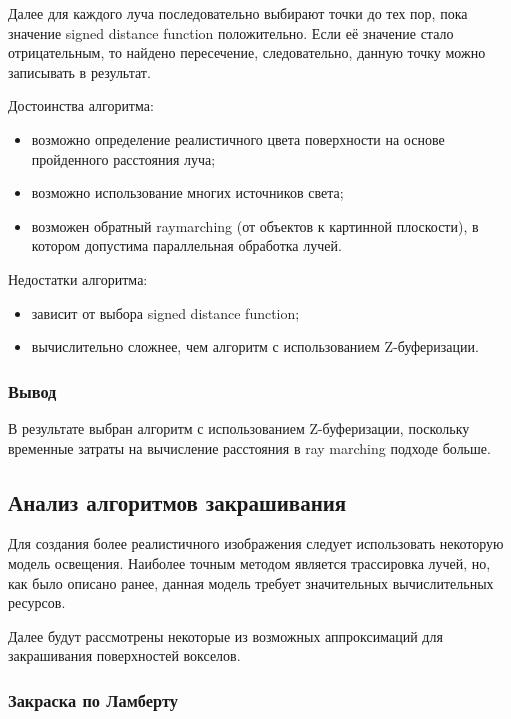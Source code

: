 Далее для каждого луча последовательно выбирают точки до тех пор, пока значение signed distance function положительно. Если её значение стало отрицательным, то найдено пересечение, следовательно, данную точку можно записывать в результат.

Достоинства алгоритма:
\begin{itemize}
    \item возможно определение реалистичного цвета поверхности на основе пройденного расстояния луча;
    \item возможно использование многих источников света;
    \item возможен обратный raymarching (от объектов к картинной плоскости), в котором допустима параллельная обработка лучей.
\end{itemize}

Недостатки алгоритма:
\begin{itemize}
    \item зависит от выбора signed distance function;
    \item вычислительно сложнее, чем алгоритм с использованием Z-буферизации\cite{site:raymarching}.
\end{itemize}

\subsubsection{Вывод}

В результате выбран алгоритм с использованием Z-буферизации, поскольку временные
затраты на вычисление расстояния в ray marching подходе больше.

\subsection{Анализ алгоритмов закрашивания}

Для создания более реалистичного изображения следует использовать некоторую модель освещения.
Наиболее точным методом является трассировка лучей\cite{site:raymarching}, но, как было описано ранее, данная модель требует значительных вычислительных ресурсов.

Далее будут рассмотрены некоторые из возможных аппроксимаций для закрашивания поверхностей вокселов.

\subsubsection{Закраска по Ламберту}

